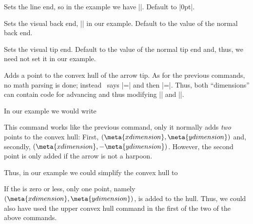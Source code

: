 \begin{command}{\pgfdeclarearrow{}}
\begin{itemize}
    \begin{command}{\pgfarrowssetlineend{}}
      Sets the line end, so in the example we have
      |\pgfarrowssettipend{-1cm}|. Default to |0pt|.
    \end{command}

    \begin{command}{\pgfarrowssetvisualbackend{}}
      Sets the visual back end, |\pgfarrowssetvisualbackend{-2cm}| in
      our example. Default to the value of the normal back end.
    \end{command}

    \begin{command}{\pgfarrowssetvisualtipend{}}
      Sets the visual tip end. Default to the value of the normal tip
      end and, thus, we need not set it in our example.
    \end{command}

    \begin{command}{\pgfarrowshullpoint{}}
      Adds a point to the convex hull of the arrow tip. As for the
      previous commands, no math parsing is done; instead \pgfname\
      says |\pgf@x=| and then |\pgf@y=|\meta{y
        dimension}. Thus, both ``dimensions'' can contain code for
      advancing and thus modifying |\pgf@x| and |\pgf@y|.

      In our example we would write
\begin{codeexample}
\pgfarrowshullpoint{1cm}{0pt}
\pgfarrowshullpoint{-3cm}{2cm}
\pgfarrowshullpoint{-3cm}{-2cm}
\end{codeexample}
    \end{command}


    \begin{command}{\pgfarrowsupperhullpoint{}}
      This command works like the previous command, only it normally
      adds \emph{two} points to the convex hull: First, $(\meta{x
        dimension},\meta{y dimension})$ and, secondly,  $(\meta{x
        dimension},-\meta{y dimension})$. However, the second point is
      only added if the arrow is not a harpoon. 

      Thus, in our example we could simplify the convex hull to
\begin{codeexample}
\pgfarrowshullpoint{1cm}{0pt}
\pgfarrowsupperhullpoint{-3cm}{2cm}
\end{codeexample}
      If the  is zero or less, only one point,
      namely $(\meta{x dimension},\meta{y dimension})$, is added to
      the hull. Thus, we could also have used the upper convex hull
      command in the first of the two of the above commands.
    \end{command}


\end{itemize}
\end{command}
